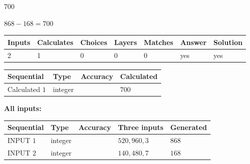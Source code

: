 \documentclass{ctexart}
\begin{document}
\noindent{}
 
 

700
 
 
\noindent{}
 
 

 
 
 
\noindent{}
 
 

$ %
868 -  %
168=   %
700$
 
 
\noindent{}
 
 

 
   
   
   
   
\noindent\begin{tabular}{|l|l|l|l|l|l|l|}
 \hline
Inputs & Calculates & Choices & Layers & Matches & Answer & Solution \\ \hline
 2  & 
 1  & 
 0
  & 
 0  & 
 0  & 
  yes & 
  yes 
  \\ \hline
 \end{tabular}
   
   
   
   
\noindent{}
   
   
  
  
\noindent\begin{tabular}{|l|l|l|l|}
\hline
 Sequential & Type & Accuracy & Calculated \\ 
\hline
 
 
  Calculated $  1 $ & integer &  & 
  $ 700 $ 
 \\  \hline  
 \end{tabular}
   
   
   
   
\noindent\vspace{0.1in}\hspace{-0.08in} {\textbf{\Large{All inputs: }}}
   
   
  
  
\noindent\begin{tabular}{|l|l|l|l|l|}
\hline
 Sequential & Type & Accuracy & Three inputs & Generated \\ 
\hline
 
 
  INPUT $  1 $ & integer &  & $
 520
 , 
 960
 , 
 3
 $ & $ 868 $ 
 \\  \hline  
 
 
  INPUT $  2 $ & integer &  & $
 140
 , 
 480
 , 
 7
 $ & $ 168 $ 
 \\  \hline  
 \end{tabular}
   
\end{document}
